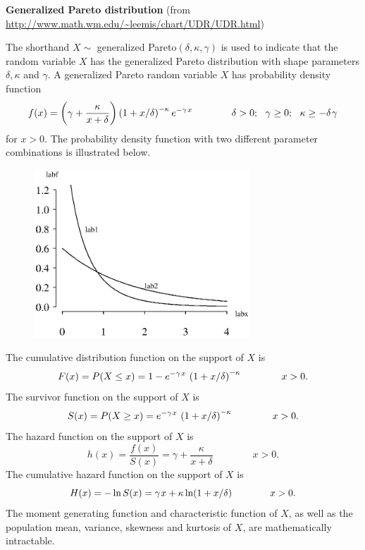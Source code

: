 \documentclass[12pt,fullpage]{article}
\begin{document}
\noindent
{\bf Generalized Pareto distribution} (from \color{blue}\url{http://www.math.wm.edu/~leemis/chart/UDR/UDR.html}\color{black})

\noindent
The shorthand $X \sim$ generalized Pareto$(\delta,\kappa,\gamma)$ is used to indicate that the
random variable $X$ has the generalized Pareto distribution with shape parameters
$\delta, \kappa$ and $\gamma$.
A generalized Pareto random variable $X$ has probability density function 
$$
f(x) = \left(\gamma + \frac{\kappa}{x + \delta}\right)\left(1+ x / \delta\right) ^ {- \kappa} e ^ {- \gamma \kern 0.08em x}      \qquad \qquad \delta > 0;\ \  \gamma\geq 0;\ \  \kappa \geq - \delta \kern 0.08 em \gamma
$$
for $x > 0$.  The probability density function with two different parameter combinations
is illustrated below.
\begin{figure}[h!]
\begin{center}
\includegraphics[width=3.2in]{GeneralizedparetoPlot.ps}
\end{center}
\end{figure}

\noindent
The cumulative distribution function on the support of $X$ is
$$
F(x) = P(X \le x) =1- e ^ {- \gamma \kern 0.08em x}\,\left(1 + x/ \delta\right)^{-\kappa}  \qquad \qquad x > 0.
$$
The survivor function on the support of $X$ is
$$
S(x) = P(X \ge x) = e ^ {- \gamma \kern 0.08em x}\,\left(1 + x/\delta\right) ^ {- \kappa}\qquad \qquad x > 0.
$$
The hazard function on the support of $X$ is
$$
h(x) =\frac{f(x)} {S(x)}= \gamma + \frac{\kappa}{x + \delta} \qquad \qquad x > 0.
$$
The cumulative hazard function on the support of $X$ is
$$
H(x) =  -\ln S(x) = \gamma \kern 0.08 em x + \kappa \ln(1 + x/ \delta) \qquad \qquad x > 0.
$$
The moment generating function and characteristic function of $X$, as well as the population mean, variance, skewness and kurtosis of $X$, are mathematically intractable.
\end{document}
